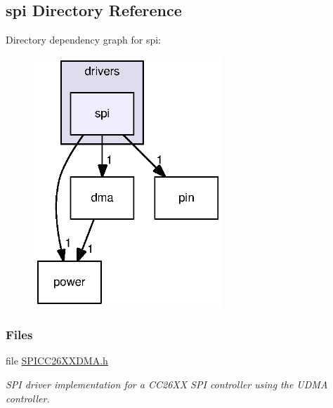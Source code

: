 \subsection{spi Directory Reference}
\label{dir_81a7ff46acfb1bdf94ccb75acbffb818}
Directory dependency graph for spi\+:
\nopagebreak
\begin{figure}[H]
\begin{center}
\leavevmode
\includegraphics[width=201pt]{dir_81a7ff46acfb1bdf94ccb75acbffb818_dep}
\end{center}
\end{figure}
\subsubsection*{Files}
\begin{DoxyCompactItemize}
\item 
file \hyperlink{_s_p_i_c_c26_x_x_d_m_a_8h}{S\+P\+I\+C\+C26\+X\+X\+D\+M\+A.\+h}
\begin{DoxyCompactList}\small\item\em S\+P\+I driver implementation for a C\+C26\+X\+X S\+P\+I controller using the U\+D\+M\+A controller. \end{DoxyCompactList}\end{DoxyCompactItemize}
